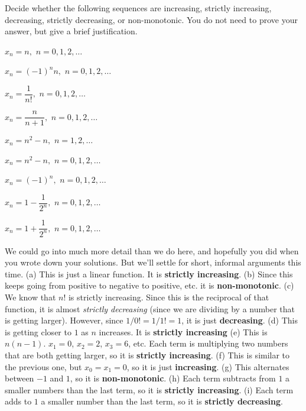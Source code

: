 \begin{exer}
Decide whether the following sequences are increasing, strictly increasing,
decreasing, strictly decreasing, or non-monotonic.  
You do not need to prove your answer, but give a brief justification.
\begin{lenum}
\item $x_n = n,$ $n = 0, 1, 2, \ldots$

\noindent \answerlinetwo
\item $x_n = (-1)^nn,$ $n = 0, 1, 2, \ldots$

\noindent \answerlinetwo
\item $x_n = \dfrac{1}{n!},$ $n = 0, 1, 2, \ldots$

\noindent  \answerlinetwo
\item $x_n = \dfrac{n}{n + 1},$ $n = 0, 1, 2, \ldots$

\noindent \answerlinetwo
\item $x_n = n^2 - n,$ $n = 1, 2, \ldots$

\noindent \answerlinetwo
\item $x_n = n^2 - n,$ $n = 0, 1, 2, \ldots$

\noindent \answerlinetwo
\item $x_n = (-1)^n,$ $n = 0, 1, 2, \ldots$

\noindent \answerlinetwo
\item $x_n = 1 - \dfrac{1}{2^n},$ $n = 0, 1, 2, \ldots$

\noindent  \answerlinetwo
\item $x_n = 1 + \dfrac{1}{2^n},$ $n = 0, 1, 2, \ldots$

\noindent \answerlinetwo
\end{lenum}
\begin{answer}
We could go into much more detail than we do here, and hopefully you did when you wrote down
your solutions.  But we'll settle for short, informal arguments this time.
 (a) This is just a linear function.  It is {\bf strictly increasing}.
 (b) Since this keeps going from positive to negative to positive, etc. it is {\bf non-monotonic}.
 (c) We know that $n!$ is strictly increasing.  Since this is the reciprocal of that function, it
 is almost {\em strictly decreasing} (since we are dividing by a number that is getting larger). 
 However, since $1/0!=1/1!=1$, it is just {\bf decreasing}.
(d) This is getting closer to $1$ as $n$ increases.  It is {\bf strictly increasing} 
(e) This is $n(n-1)$.  $x_1=0$, $x_2=2$, $x_3=6$, etc. 
Each term is multiplying two numbers that are both
getting larger, so it is {\bf strictly increasing}. 
(f) This is similar to the previous one, but $x_0=x_1=0$, so it is just {\bf increasing}.
(g) This alternates between $-1$ and $1$, so it is {\bf non-monotonic}.  
(h) Each term subtracts from $1$ a smaller numbers than the last term, so it is {\bf strictly increasing}. 
(i) Each term adds to $1$ a smaller number than the last term, so it is {\bf strictly decreasing}.
\end{answer}
\end{exer}


